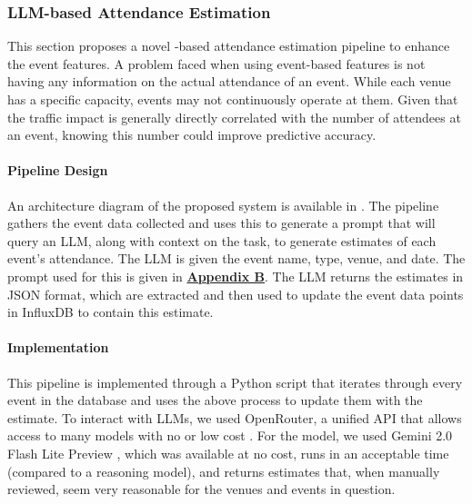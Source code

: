 \subsubsection{LLM-based Attendance Estimation}
\label{link:llm-attendance-estimation}
This section proposes a novel -based attendance estimation pipeline to enhance the event features. A problem faced when using event-based features is not having any information on the actual attendance of an event. While each venue has a specific capacity, events may not continuously operate at them. Given that the traffic impact is generally directly correlated with the number of attendees at an event, knowing this number could improve predictive accuracy.

\paragraph{Pipeline Design}
An architecture diagram of the proposed system is available in . The pipeline gathers the event data collected and uses this to generate a prompt that will query an LLM, along with context on the task, to generate estimates of each event's attendance. The LLM is given the event name, type, venue, and date. The prompt used for this is given in \textbf{\hyperref[appdx:b]{Appendix B}}. The LLM returns the estimates in JSON format, which are extracted and then used to update the event data points in InfluxDB to contain this estimate.

\paragraph{Implementation}
This pipeline is implemented through a Python script that iterates through every event in the database and uses the above process to update them with the estimate. To interact with LLMs, we used OpenRouter, a unified API that allows access to many models with no or low cost \cite{noauthor_openrouter_nodate}. For the model, we used Gemini 2.0 Flash Lite Preview \cite{noauthor_gemini_nodate}, which was available at no cost, runs in an acceptable time (compared to a reasoning model), and returns estimates that, when manually reviewed, seem very reasonable for the venues and events in question.


